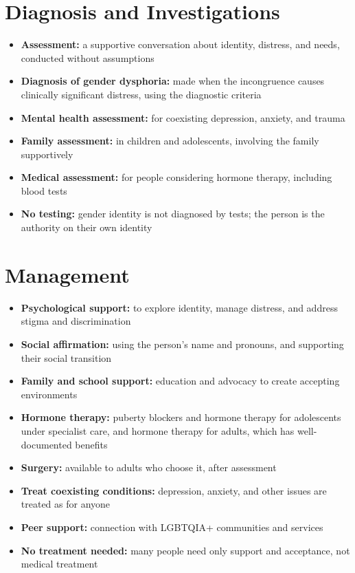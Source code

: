 \section*{Diagnosis and Investigations}
\begin{itemize}
    \item \textbf{Assessment:} a supportive conversation about identity, distress, and needs, conducted without assumptions
    \item \textbf{Diagnosis of gender dysphoria:} made when the incongruence causes clinically significant distress, using the diagnostic criteria
    \item \textbf{Mental health assessment:} for coexisting depression, anxiety, and trauma
    \item \textbf{Family assessment:} in children and adolescents, involving the family supportively
    \item \textbf{Medical assessment:} for people considering hormone therapy, including blood tests
    \item \textbf{No testing:} gender identity is not diagnosed by tests; the person is the authority on their own identity
\end{itemize}

\section*{Management}
\begin{itemize}
    \item \textbf{Psychological support:} to explore identity, manage distress, and address stigma and discrimination
    \item \textbf{Social affirmation:} using the person's name and pronouns, and supporting their social transition
    \item \textbf{Family and school support:} education and advocacy to create accepting environments
    \item \textbf{Hormone therapy:} puberty blockers and hormone therapy for adolescents under specialist care, and hormone therapy for adults, which has well-documented benefits
    \item \textbf{Surgery:} available to adults who choose it, after assessment
    \item \textbf{Treat coexisting conditions:} depression, anxiety, and other issues are treated as for anyone
    \item \textbf{Peer support:} connection with LGBTQIA+ communities and services
    \item \textbf{No treatment needed:} many people need only support and acceptance, not medical treatment
\end{itemize}


